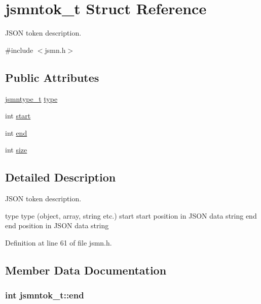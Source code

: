 \hypertarget{structjsmntok__t}{\section{jsmntok\-\_\-t Struct Reference}
\label{structjsmntok__t}
}


J\-S\-O\-N token description.  




{\ttfamily \#include $<$jsmn.\-h$>$}

\subsection*{Public Attributes}
\begin{DoxyCompactItemize}
\item 
\hyperlink{global__controller_2jsmn_8h_a065320719769f9dc1fbe30094e52802f}{jsmntype\-\_\-t} \hyperlink{structjsmntok__t_ac03dbd6b83cbcd979eb64702d5b9943e}{type}
\item 
int \hyperlink{structjsmntok__t_a0a8f55d0095f268ce8e224fe1234acd0}{start}
\item 
int \hyperlink{structjsmntok__t_ab49e0369f39e9b6174141e7f5bde5996}{end}
\item 
int \hyperlink{structjsmntok__t_a8ac3694b7335456c8e602197778883db}{size}
\end{DoxyCompactItemize}


\subsection{Detailed Description}
J\-S\-O\-N token description. 

type type (object, array, string etc.) start start position in J\-S\-O\-N data string end end position in J\-S\-O\-N data string 

Definition at line 61 of file jsmn.\-h.



\subsection{Member Data Documentation}
\hypertarget{structjsmntok__t_ab49e0369f39e9b6174141e7f5bde5996}{
\subsubsection[{end}]{\setlength{\rightskip}{0pt plus 5cm}int jsmntok\-\_\-t\-::end}}\label{structjsmntok__t_ab49e0369f39e9b6174141e7f5bde5996}


